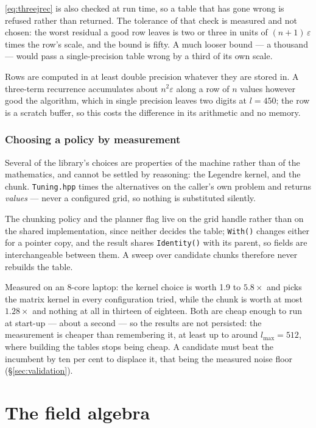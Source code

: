 \documentclass[11pt,a4paper]{article}
\newcommand{\code}[1]{\texttt{#1}}
\begin{document}
\eqref{eq:threejrec} is also checked at run time, so a table that has gone
wrong is refused rather than returned.  The tolerance of that check is
measured and not chosen: the worst residual a good row leaves is two or
three in units of $(n+1)\,\varepsilon$ times the row's scale, and the bound
is fifty.  A much looser bound --- a thousand --- would pass a
single-precision table wrong by a third of its own scale.

Rows are computed in at least double precision whatever they are stored in.
A three-term recurrence accumulates about $n^2\varepsilon$ along a row of $n$
values however good the algorithm, which in single precision leaves two
digits at $l=450$; the row is a scratch buffer, so this costs the
difference in its arithmetic and no memory.

\section{Choosing a policy by measurement}
\label{sec:tuning}

Several of the library's choices are properties of the machine rather than of
the mathematics, and cannot be settled by reasoning: the Legendre kernel,
and the chunk.  \code{Tuning.hpp} times the alternatives on the caller's
own problem and returns \emph{values} --- never a configured grid, so nothing
is substituted silently.

The chunking policy and the planner flag live on the grid handle rather
than on the shared implementation, since neither decides the table;
\code{With()} changes either for a pointer copy, and the result shares
\code{Identity()} with its parent, so fields are interchangeable between
them.  A sweep over candidate chunks therefore never rebuilds the table.

Measured on an 8-core laptop: the kernel choice is worth 1.9 to $5.8\times$
and picks the matrix kernel in every configuration tried, while the chunk
is worth at most $1.28\times$ and nothing at all in thirteen of eighteen.
Both are cheap enough to run at start-up --- about a second --- so the
results are not persisted: the measurement is cheaper than remembering it,
at least up to around $l_{\max}=512$, where building the tables stops being
cheap.  A candidate must beat the incumbent by ten per cent to displace it,
that being the measured noise floor (\S\ref{sec:validation}).

\part{The field algebra}
\label{part:algebra}
\end{document}
